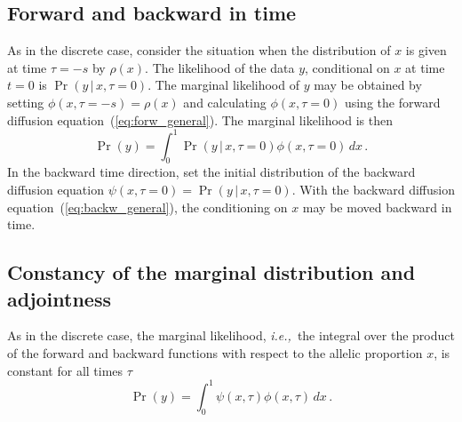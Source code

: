 \documentclass[preprint]{elsarticle}
\newcommand\given{{\,|\,}}
\newcommand\ie{{\it i.e.,}}
\newcommand\s{\ensuremath{s}}
\begin{document}
\subsection{Forward and backward in time}

As in the discrete case, consider the situation when the distribution of $x$ is given at time $\tau=-\s$ by $\rho(x)$. The likelihood of the data $y$, conditional on $x$ at time $t=0$ is $\Pr(y\given x,\tau=0)$. The marginal likelihood of $y$ may be obtained by setting $\phi(x,\tau=-\s)=\rho(x)$ and calculating $\phi(x,\tau=0)$ using the forward diffusion equation~(\ref{eq:forw_general}). The marginal likelihood is then
\begin{equation}\label{eq:marg_like2}
\Pr(y)= \int_{0}^{1} \Pr(y\given x,\tau=0)\phi(x,\tau=0) \,dx\,.
\end{equation}
In the backward time direction, set the initial distribution of the backward diffusion equation  $\psi(x,\tau=0)=\Pr(y\given x,\tau=0)$. With the backward diffusion equation~(\ref{eq:backw_general}), the conditioning on $x$ may be moved backward in time. 

\subsection{Constancy of the marginal distribution and adjointness}

As in the discrete case, the marginal likelihood, \ie\ the integral over the product of the forward and backward functions with respect to the allelic proportion $x$, is constant for all times $\tau$
\begin{equation}\label{eq:marg_like}
\Pr(y) = \int_{0}^{1} \psi(x,\tau) \phi(x,\tau) \,dx\,.
\end{equation}
\end{document}
